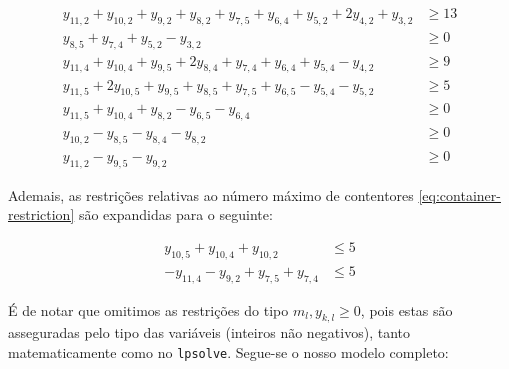 \documentclass[12pt, a4paper, titlepage]{article}
\begin{document}
\begin{equation}
    \begin{split}
        y_{11, 2} + y_{10, 2} + y_{9, 2} + y_{8, 2} + y_{7, 5} + y_{6, 4} + y_{5, 2} + 2 y_{4, 2} +
            y_{3, 2} & \geq 13 \\
        y_{8, 5} + y_{7, 4} + y_{5, 2} - y_{3, 2} & \geq 0 \\
        y_{11, 4} + y_{10, 4} + y_{9, 5} + 2 y_{8, 4} + y_{7, 4} + y_{6, 4} + y_{5, 4} - y_{4, 2}
            & \geq 9 \\
        y_{11, 5} + 2 y_{10, 5} + y_{9, 5} + y_{8, 5} + y_{7, 5} + y_{6, 5} - y_{5, 4} - y_{5, 2}
            & \geq 5 \\
        y_{11, 5} + y_{10, 4} + y_{8, 2} - y_{6, 5} - y_{6, 4} & \geq 0 \\
        y_{10, 2} - y_{8, 5} - y_{8, 4} - y_{8, 2} & \geq 0 \\
        y_{11, 2} - y_{9, 5} - y_{9, 2} & \geq 0
    \end{split} \nonumber
\end{equation}

Ademais, as restrições relativas ao número máximo de contentores \eqref{eq:container-restriction}
são expandidas para o seguinte:

\begin{equation}
    \begin{split}
        y_{10, 5} + y_{10, 4} + y_{10, 2} & \leq 5 \\
        - y_{11, 4} - y_{9, 2}  + y_{7, 5} + y_{7, 4} & \leq 5
    \end{split}
\end{equation}

É de notar que omitimos as restrições do tipo $m_l, y_{k, l} \geq 0$, pois estas são asseguradas
pelo tipo das variáveis (inteiros não negativos), tanto matematicamente como no \texttt{lpsolve}.
Segue-se o nosso modelo completo:
\end{document}
